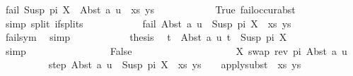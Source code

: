 \begin{isabellebody}
\ {\isachardoublequoteopen}fail\ {\isacharparenleft}{\kern0pt}{\isacharparenleft}{\kern0pt}Susp\ pi\ X\ {\isasymapprox}{\isacharquery}{\kern0pt}\ Abst\ a\ u{\isacharparenright}{\kern0pt}\ {\isacharhash}{\kern0pt}\ xs{\isacharcomma}{\kern0pt}\ ys{\isacharparenright}{\kern0pt}{\isachardoublequoteclose}\isanewline
\ \ \ \ \ \ \ \ \ \ \isamarkupfalse%
\ True\ fail{\isacharunderscore}{\kern0pt}occur{\isacharunderscore}{\kern0pt}abst\ \isamarkupfalse%
\ {\isacharparenleft}{\kern0pt}simp\ split{\isacharcolon}{\kern0pt}\ if{\isacharunderscore}{\kern0pt}splits{\isacharparenright}{\kern0pt}\isanewline
\ \ \ \ \ \ \ \ \isamarkupfalse%
\ \isamarkupfalse%
\ {\isachardoublequoteopen}fail\ {\isacharparenleft}{\kern0pt}{\isacharparenleft}{\kern0pt}Abst\ a\ u\ {\isasymapprox}{\isacharquery}{\kern0pt}\ Susp\ pi\ X{\isacharparenright}{\kern0pt}\ {\isacharhash}{\kern0pt}\ xs{\isacharcomma}{\kern0pt}\ ys{\isacharparenright}{\kern0pt}{\isachardoublequoteclose}\isanewline
\ \ \ \ \ \ \ \ \ \ \isamarkupfalse%
\ fail{\isacharunderscore}{\kern0pt}sym\ \isamarkupfalse%
\ simp\isanewline
\ \ \ \ \ \ \ \ \isamarkupfalse%
\ \isamarkupfalse%
\ {\isacharquery}{\kern0pt}thesis\ \isamarkupfalse%
\ {\isacartoucheopen}t{}\ {\isacharequal}{\kern0pt}\ Abst\ a\ u{\isacartoucheclose}\ {\isacartoucheopen}t{}\ {\isacharequal}{\kern0pt}\ Susp\ pi\ X{\isacartoucheclose}\isanewline
\ \ \ \ \ \ \ \ \ \ \isamarkupfalse%
\ simp\isanewline
\ \ \ \ \ \ \isamarkupfalse%
\isanewline
\ \ \ \ \ \ \ \ \isamarkupfalse%
\ False\isanewline
\ \ \ \ \ \ \ \ %
\isanewline
\ \ \ \ \ \ \ \ \isamarkupfalse%
\ {\isacharquery}{\kern0pt}{\isasymsigma}\ {\isacharequal}{\kern0pt}\ {\isachardoublequoteopen}{\isacharbrackleft}{\kern0pt}{\isacharparenleft}{\kern0pt}X{\isacharcomma}{\kern0pt}\ swap\ {\isacharparenleft}{\kern0pt}rev\ pi{\isacharparenright}{\kern0pt}\ {\isacharparenleft}{\kern0pt}Abst\ a\ u{\isacharparenright}{\kern0pt}{\isacharparenright}{\kern0pt}{\isacharbrackright}{\kern0pt}{\isachardoublequoteclose}\isanewline
\ \ \ \ \ \ \ \ \isamarkupfalse%
\ step{\isacharcolon}{\kern0pt}\ {\isachardoublequoteopen}{\isacharparenleft}{\kern0pt}{\isacharparenleft}{\kern0pt}Abst\ a\ u\ {\isasymapprox}{\isacharquery}{\kern0pt}\ Susp\ pi\ X{\isacharparenright}{\kern0pt}\ {\isacharhash}{\kern0pt}\ xs{\isacharcomma}{\kern0pt}\ ys{\isacharparenright}{\kern0pt}\ {\isasymturnstile}\ {\isacharquery}{\kern0pt}{\isasymsigma}\ {\isasymleadsto}\ apply{\isacharunderscore}{\kern0pt}subst\ {\isacharquery}{\kern0pt}{\isasymsigma}\ {\isacharparenleft}{\kern0pt}xs{\isacharcomma}{\kern0pt}\ ys{\isacharparenright}{\kern0pt}{\isachardoublequoteclose}\isanewline

\end{isabellebody}

